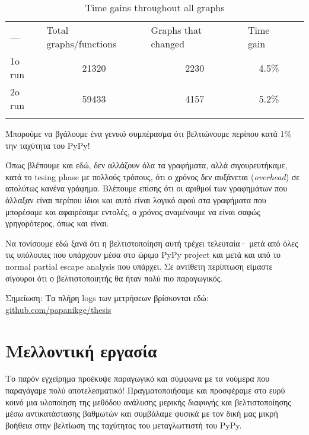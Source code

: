 \begin{table}[h]
\centering
\caption{Time gains throughout all graphs}
\label{table-time}
\begin{tabular}{lllll}
–– & \cellcolor[HTML]{C0C0C0}Total graphs/functions & \cellcolor[HTML]{C0C0C0}Graphs that changed & \cellcolor[HTML]{C0C0C0}Time gain &  \\
\cellcolor[HTML]{C0C0C0}1o run & \multicolumn{1}{c}{21320} & \multicolumn{1}{c}{2230} & \multicolumn{1}{c}{4.5\%} &  \\
\cellcolor[HTML]{C0C0C0}2o run & \multicolumn{1}{c}{59433} & \multicolumn{1}{c}{4157} & \multicolumn{1}{c}{5.2\%} &  \\
 &  &  &  & 
\end{tabular}
\end{table}
Μπορούμε να βγάλουμε ένα γενικό συμπέρασμα ότι βελτιώνουμε περίπου κατά 1\% την
ταχύτητα του PyPy!

Όπως βλέπουμε και εδώ, δεν αλλάζουν όλα τα γραφήματα, αλλά σιγουρευτήκαμε, κατά
το tesing phase με πολλούς τρόπους, ότι ο χρόνος δεν αυξάνεται
(\textit{overhead}) σε απολύτως κανένα γράφημα. Βλέπουμε επίσης ότι οι αριθμοί
των γραφημάτων που άλλαξαν είναι περίπου ίδιοι και αυτό είναι λογικό αφού στα
γραφήματα που μπορέσαμε και αφαιρέσαμε εντολές, ο χρόνος αναμένουμε να είναι
σαφώς γρηγορότερος, όπως και είναι.


Να τονίσουμε εδώ ξανά ότι η βελτιστοποίηση αυτή τρέχει τελευταία· μετά από όλες
τις υπόλοιπες που υπάρχουν μέσα στο ώριμο PyPy project και μετά και από το
normal partial escape analysis που υπάρχει. Σε αντίθετη περίπτωση είμαστε
σίγουροι ότι ο βελτιστοποιητής θα ήταν πολύ πιο παραγωγικός.

Σημείωση: Τα πλήρη logs των μετρήσεων βρίσκονται εδώ:
\href{}{github.com/papanikge/thesis}


\section{Μελλοντική εργασία}

Το παρόν εγχείρημα προέκυψε παραγωγικό και σύμφωνα με τα νούμερα που παραγάγαμε
πολύ αποτελεσματικό! Πραγματοποιήσαμε και προσφέραμε στο ευρύ κοινό μια
υλοποίηση της μεθόδου ανάλυσης μερικής διαφυγής και βελτιστοποίησης μέσω
αντικατάστασης βαθμωτών και συμβάλαμε φυσικά με τον δική μας μικρή βοήθεια στην
βελτίωση της ταχύτητας του μεταγλωττιστή του PyPy.

